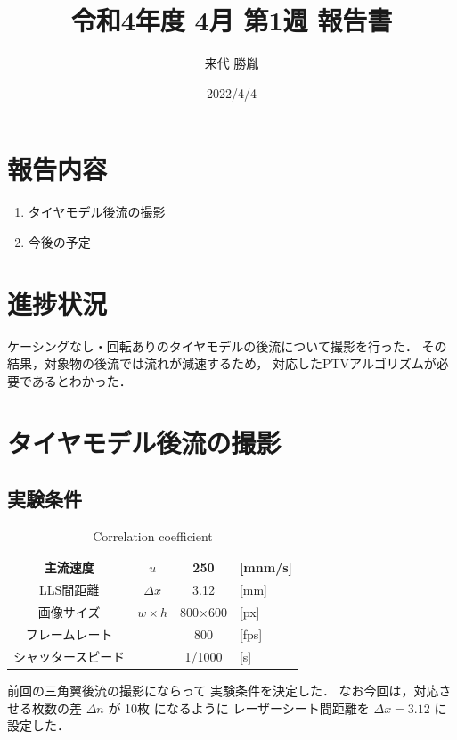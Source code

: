 \documentclass[twocolumn,a4j]{jsarticle}
\author{来代 勝胤}
\title{令和4年度 4月 第1週 報告書}
\date{2022/4/4}
\begin{document}
\columnseprule=0.1mm
\maketitle

\section*{報告内容}
\begin{enumerate}[1.]
  \item タイヤモデル後流の撮影
  \item 今後の予定
\end{enumerate}

\section*{進捗状況}
ケーシングなし・回転ありのタイヤモデルの後流について撮影を行った．
その結果，対象物の後流では流れが減速するため，
対応したPTVアルゴリズムが必要であるとわかった．

\section{タイヤモデル後流の撮影}

\subsection{実験条件}
\begin{table}[hbtp]
  \label{table:data_type}
  \caption{Correlation coefficient}
  \centering
  \begin{tabular}{ c | c | c  l }
    \hline
    主流速度           & $u$          & 250            & [mnm/s] \\ \hline
    LLS間距離          & $\Delta x$   & 3.12           & [mm]    \\ \hline
    画像サイズ         & $w \times h$ & 800$\times$600 & [px]    \\ \hline
    フレームレート     &              & 800            & [fps]   \\ \hline
    シャッタースピード &              & 1/1000         & [s]     \\ \hline
  \end{tabular}
\end{table}

前回の三角翼後流の撮影にならって
実験条件を決定した．
なお今回は，対応させる枚数の差 $\Delta n$ が 10枚 になるように
レーザーシート間距離を $\Delta x = 3.12$ に設定した．
\end{document}
